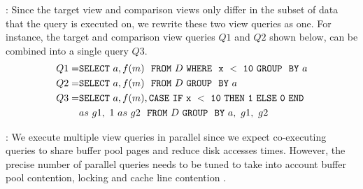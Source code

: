 :
Since the target view and comparison views only differ in the subset of data
that the query is executed on, we rewrite these two view queries as
one. For instance, the target and comparison view queries $Q1$ and $Q2$
shown below, can be combined into a single query $Q3$.
\vspace{-5pt}
\begin{align*} 
Q1 = &{\tt SELECT \ } a, f(m) \ \ {\tt FROM} \  D\  {\tt WHERE \ \ x\ <\ 10\
GROUP \ \ BY} \ a \\
Q2 = &{\tt SELECT \ } a, f(m) \ \ {\tt FROM} \  D\  {\tt GROUP \ \ BY} \ a \\
Q3 = &{\tt SELECT \ } a, f(m), {\tt CASE\ IF\ x\ <\ 10\ THEN\ 1\ ELSE\ 0\
END}\\ 
&as\ g1,\ 1\ as\ g2 \ \ {\tt FROM} \ D\ {\tt GROUP \ \ BY} \ a,\ g1,\ g2
\end{align*}

:
  We execute multiple view queries in parallel since we expect co-executing queries 
  to share buffer pool pages and reduce disk accesses times. 
  However, the precise number of parallel queries needs to be tuned to take into account 
  buffer pool contention, locking and cache line contention \cite{Postgres_wiki}. 



